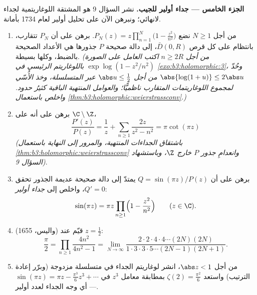 \begin{problem}
\medskip
\noindent\textbf{الجزء الخامس --- جداء أولير للجيب.} نشر
السؤال 9 هو المشتقة اللوغاريتمية لجداء لانهائي؛ ونبرهن الآن
على تحليل أولير لعام 1734 بأمانة.
\begin{enumerate}[resume]
  \item من أجل $N \geq 1$ نضع $P_N(z) =
        z\prod_{n=1}^{N}\bigl(1 - \frac{z^2}{n^2}\bigr)$. برهن على أن $P_N$
        تتقارب، بانتظام على كل قرص $\bar D(0, R)$، إلى دالة
        صحيحة $P$ جذورها هي الأعداد الصحيحة بالضبط، وكلها
        بسيطة. \emph{(من أجل $n
        \geq 2R$ اكتب العامل على الصورة
        $\exp\log(1 -
        z^2/n^2)$ باللوغاريتم الرئيسي في \cref{exo:b3:holomorphic:3}، وحُدّ
        $\abs{\log(1+u)}
        \leq 2\abs u$ من أجل $\abs u \leq \frac12$ عبر المتسلسلة، وخذ الأُسّي
        لمجموع اللوغاريتمات المتقارب ناظميًّا؛ والعوامل
        المنتهية الباقية كثيرُ حدود. واخلص باستعمال \cref{thm:b3:holomorphic:weierstrassconv}.)}
  \item برهن على أنه على $\C\setminus\Z$،
        \[
        \frac{P'(z)}{P(z)} = \frac1z +
        \sum_{n\geq1}\frac{2z}{z^2 - n^2} = \pi\cot(\pi z)
        \]
        \emph{(باشتقاق الجداءات المنتهية، والمرور إلى النهاية
        باستعمال \cref{thm:b3:holomorphic:weierstrassconv} وانعدامِ جذور $P$ خارج $\Z$،
        وباستشهاد السؤال 9)}.
  \item برهن على أن $Q = \sin(\pi z)/P(z)$ يمتدّ إلى دالة صحيحة عديمة الجذور
        تحقق $Q' = 0$، واخلص إلى \emph{جداء أولير}:
        \[
        \sin(\pi z) = \pi z\prod_{n\geq1}
        \Bigl(1 - \frac{z^2}{n^2}\Bigr)
        \qquad (z \in \C) .
        \]
  \item (واليس، 1655) قيّم عند $z = \frac12$:
        \[
        \frac\pi2 = \prod_{n\geq1}\frac{4n^2}{4n^2 - 1}
        = \lim_{N\to\infty}
        \frac{2\cdot2\cdot4\cdot4\cdots(2N)(2N)}
        {1\cdot3\cdot3\cdot5\cdots(2N-1)(2N+1)} .
        \]
  \item من أجل $\abs z < 1$، انشر لوغاريتم الجداء في متسلسلة
        مزدوجة (وبرّر إعادة الترتيب) واستعد $\zeta(2) =
        \frac{\pi^2}6$ بمطابقة
        معامل $z^3$ في $\sin(\pi z) = \pi z - \frac{\pi^3}6z^3 + \cdots$ --- أي وجه الجداء لعدد أولير.
\end{enumerate}


\end{problem}
